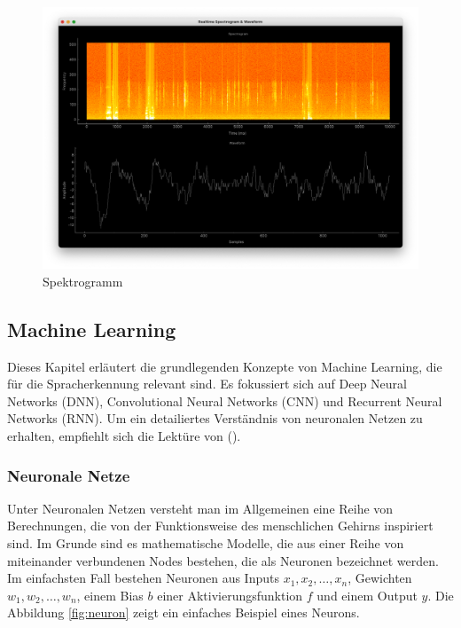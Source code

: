 \documentclass[11pt,a4paper]{article}
\begin{document}
\begin{figure}[h]
	\centering
	\includegraphics[width=0.73\linewidth]{img/spectrogram.png}
	\caption{Spektrogramm}
	\label{fig:spectrogram}
\end{figure}

\subsection{Machine Learning}
Dieses Kapitel erläutert die grundlegenden Konzepte von Machine Learning, die für die
Spracherkennung relevant sind. Es fokussiert sich auf Deep Neural Networks (DNN), Convolutional
Neural Networks (CNN) und Recurrent Neural Networks (RNN). Um ein detailiertes Verständnis von
neuronalen Netzen zu erhalten, empfiehlt sich die Lektüre von (\cite{weidman2019deep}).

\subsubsection{Neuronale Netze}
Unter Neuronalen Netzen versteht man im Allgemeinen eine Reihe von Berechnungen, die von der
Funktionsweise des menschlichen Gehirns inspiriert sind. Im Grunde sind es mathematische Modelle,
die aus einer Reihe von miteinander verbundenen Nodes bestehen, die als Neuronen bezeichnet werden.
Im einfachsten Fall bestehen Neuronen aus Inputs \(x_{1}, x_{2}, \dots, x_{n}\), Gewichten
\(w_{1}, w_{2}, \dots, w_{n}\), einem Bias \(b\) einer Aktivierungsfunktion \(f\) und einem Output
\(y\). Die Abbildung \ref{fig:neuron} zeigt ein einfaches Beispiel eines Neurons.
\end{document}
